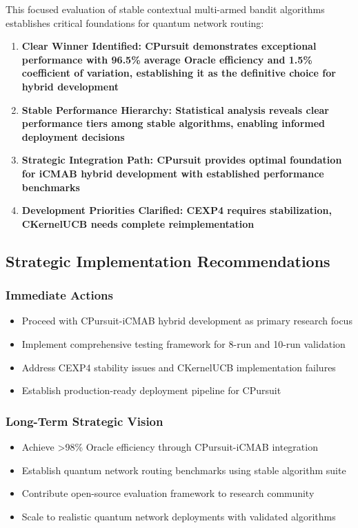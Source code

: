 \documentclass[12pt,a4paper]{article}
\newcommand{\critical}[1]{\textcolor{criticalcolor}{\textbf{#1}}}
\newcommand{\success}[1]{\textcolor{successcolor}{\textbf{#1}}}
\newcommand{\hybrid}[1]{\textcolor{hybridcolor}{\textbf{#1}}}
\begin{document}
This focused evaluation of stable contextual multi-armed bandit algorithms establishes critical foundations for quantum network routing:

\begin{enumerate}
\item \success{\textbf{Clear Winner Identified}: CPursuit demonstrates exceptional performance with 96.5\% average Oracle efficiency and 1.5\% coefficient of variation, establishing it as the definitive choice for hybrid development}

\item \success{\textbf{Stable Performance Hierarchy}: Statistical analysis reveals clear performance tiers among stable algorithms, enabling informed deployment decisions}

\item \hybrid{\textbf{Strategic Integration Path}: CPursuit provides optimal foundation for iCMAB hybrid development with established performance benchmarks}

\item \critical{\textbf{Development Priorities Clarified}: CEXP4 requires stabilization, CKernelUCB needs complete reimplementation}
\end{enumerate}

\subsection{Strategic Implementation Recommendations}

\subsubsection{Immediate Actions}
\begin{itemize}
\item Proceed with CPursuit-iCMAB hybrid development as primary research focus
\item Implement comprehensive testing framework for 8-run and 10-run validation
\item Address CEXP4 stability issues and CKernelUCB implementation failures
\item Establish production-ready deployment pipeline for CPursuit
\end{itemize}

\subsubsection{Long-Term Strategic Vision}
\begin{itemize}
\item Achieve >98\% Oracle efficiency through CPursuit-iCMAB integration
\item Establish quantum network routing benchmarks using stable algorithm suite
\item Contribute open-source evaluation framework to research community
\item Scale to realistic quantum network deployments with validated algorithms
\end{itemize}
\end{document}
